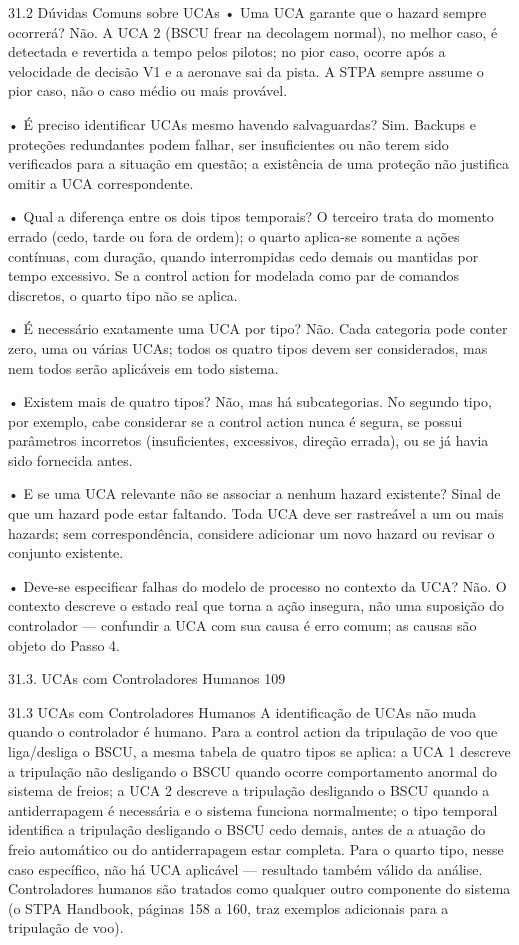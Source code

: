 31.2 Dúvidas Comuns sobre UCAs • Uma UCA garante que o hazard sempre ocorrerá? Não. A UCA 2 (BSCU frear na decolagem normal), no melhor caso, é detectada e revertida a tempo pelos pilotos; no pior caso, ocorre após a velocidade de decisão V1 e a aeronave sai da pista. A STPA sempre assume o pior caso, não o caso médio ou mais provável.

• É preciso identificar UCAs mesmo havendo salvaguardas? Sim. Backups e proteções redundantes podem falhar, ser insuficientes ou não terem sido verificados para a situação em questão; a existência de uma proteção não justifica omitir a UCA correspondente.

• Qual a diferença entre os dois tipos temporais? O terceiro trata do momento errado (cedo, tarde ou fora de ordem); o quarto aplica-se somente a ações contínuas, com duração, quando interrompidas cedo demais ou mantidas por tempo excessivo. Se a control action for modelada como par de comandos discretos, o quarto tipo não se aplica.

• É necessário exatamente uma UCA por tipo? Não. Cada categoria pode conter zero, uma ou várias UCAs; todos os quatro tipos devem ser considerados, mas nem todos serão aplicáveis em todo sistema.

• Existem mais de quatro tipos? Não, mas há subcategorias. No segundo tipo, por exemplo, cabe considerar se a control action nunca é segura, se possui parâmetros incorretos (insuficientes, excessivos, direção errada), ou se já havia sido fornecida antes.

• E se uma UCA relevante não se associar a nenhum hazard existente? Sinal de que um hazard pode estar faltando. Toda UCA deve ser rastreável a um ou mais hazards; sem correspondência, considere adicionar um novo hazard ou revisar o conjunto existente.

• Deve-se especificar falhas do modelo de processo no contexto da UCA? Não. O contexto descreve o estado real que torna a ação insegura, não uma suposição do controlador — confundir a UCA com sua causa é erro comum; as causas são objeto do Passo 4.

31.3. UCAs com Controladores Humanos 109

31.3 UCAs com Controladores Humanos A identificação de UCAs não muda quando o controlador é humano. Para a control action da tripulação de voo que liga/desliga o BSCU, a mesma tabela de quatro tipos se aplica: a UCA 1 descreve a tripulação não desligando o BSCU quando ocorre comportamento anormal do sistema de freios; a UCA 2 descreve a tripulação desligando o BSCU quando a antiderrapagem é necessária e o sistema funciona normalmente; o tipo temporal identifica a tripulação desligando o BSCU cedo demais, antes de a atuação do freio automático ou do antiderrapagem estar completa. Para o quarto tipo, nesse caso específico, não há UCA aplicável — resultado também válido da análise. Controladores humanos são tratados como qualquer outro componente do sistema (o STPA Handbook, páginas 158 a 160, traz exemplos adicionais para a tripulação de voo).

